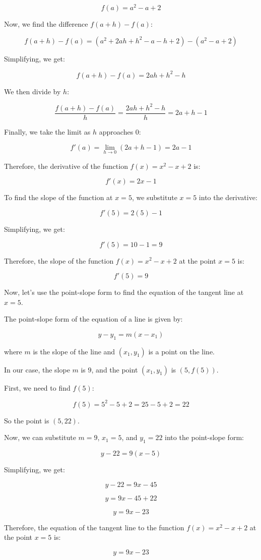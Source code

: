 \documentclass[12pt]{article}
\begin{document}
\[
f(a) = a^2 - a + 2
\]

Now, we find the difference \( f(a+h) - f(a) \):

\[
f(a+h) - f(a) = (a^2 + 2ah + h^2 - a - h + 2) - (a^2 - a + 2)
\]

Simplifying, we get:

\[
f(a+h) - f(a) = 2ah + h^2 - h
\]

We then divide by \( h \):

\[
\frac{f(a+h) - f(a)}{h} = \frac{2ah + h^2 - h}{h} = 2a + h - 1
\]

Finally, we take the limit as \( h \) approaches 0:

\[
f'(a) = \lim_{{h \to 0}} (2a + h - 1) = 2a - 1
\]

Therefore, the derivative of the function \( f(x) = x^2 - x + 2 \) is:

\[
f'(x) = 2x - 1
\]

To find the slope of the function at \( x = 5 \), we substitute \( x = 5 \) into the derivative:

\[
f'(5) = 2(5) - 1
\]

Simplifying, we get:

\[
f'(5) = 10 - 1 = 9
\]

Therefore, the slope of the function \( f(x) = x^2 - x + 2 \) at the point \( x = 5 \) is:

\[
f'(5) = 9
\]

Now, let's use the point-slope form to find the equation of the tangent line at \( x = 5 \).

The point-slope form of the equation of a line is given by:

\[
y - y_1 = m(x - x_1)
\]

where \( m \) is the slope of the line and \((x_1, y_1)\) is a point on the line.

In our case, the slope \( m \) is \( 9 \), and the point \((x_1, y_1)\) is \((5, f(5))\).

First, we need to find \( f(5) \):

\[
f(5) = 5^2 - 5 + 2 = 25 - 5 + 2 = 22
\]

So the point is \((5, 22)\).

Now, we can substitute \( m = 9 \), \( x_1 = 5 \), and \( y_1 = 22 \) into the point-slope form:

\[
y - 22 = 9(x - 5)
\]

Simplifying, we get:

\[
y - 22 = 9x - 45
\]

\[
y = 9x - 45 + 22
\]

\[
y = 9x - 23
\]

Therefore, the equation of the tangent line to the function \( f(x) = x^2 - x + 2 \) at the point \( x = 5 \) is:

\[
y = 9x - 23
\]
\end{document}
